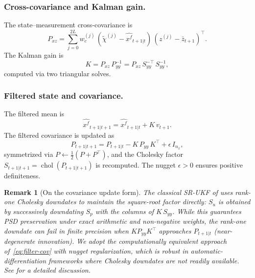 \documentclass[12pt,a4paper]{article}
\newtheorem{remark}[theorem]{Remark}
\newcommand{\xf}{{x^{f}}}
\DeclareMathOperator{\chol}{chol}
\begin{document}
\subsubsection{Cross-covariance and Kalman gain.}

The state--measurement cross-covariance is
\begin{equation}\label{eq:Pxz}
P_{xz} = \sum_{j=0}^{2L} w_c^{(j)}\,
  (\tilde{\chi}^{(j)} - \hat{\xf}_{t+1|t})\,
  (z^{(j)} - \bar{z}_{t+1})^\top.
\end{equation}
The Kalman gain is
\begin{equation}\label{eq:gain}
K = P_{xz}\,P_{yy}^{-1}
  = P_{xz}\,S_{yy}^{-\top}\,S_{yy}^{-1},
\end{equation}
computed via two triangular solves.

\subsubsection{Filtered state and covariance.}

The filtered mean is
\begin{equation}\label{eq:filter-mean}
\hat{\xf}_{t+1|t+1} = \hat{\xf}_{t+1|t} + K\,v_{t+1}.
\end{equation}
The filtered covariance is updated as
\begin{equation}\label{eq:filter-cov}
P_{t+1|t+1} = P_{t+1|t} - K\,P_{yy}\,K^\top + \epsilon\,I_{n_x},
\end{equation}
symmetrized via $P \leftarrow \tfrac{1}{2}(P + P^\top)$, and the
Cholesky factor $S_{t+1|t+1} = \chol(P_{t+1|t+1})$ is recomputed.
The nugget $\epsilon > 0$ ensures positive definiteness.

\begin{remark}[On the covariance update form]
The classical SR-UKF of \citet{van2001square} uses rank-one Cholesky
downdates to maintain the square-root factor directly: $S_u$ is
obtained by successively downdating $S_p$ with the columns of
$K\,S_{yy}$. While this guarantees PSD preservation under exact
arithmetic and non-negative weights, the rank-one downdate can fail
in finite precision when $K P_{yy} K^\top$ approaches $P_{t+1|t}$
(near-degenerate innovation). We adopt the computationally equivalent
approach of~\eqref{eq:filter-cov} with nugget regularization, which
is robust in automatic-differentiation frameworks where Cholesky
downdates are not readily available. See  for
a detailed discussion.
\end{remark}
\end{document}
